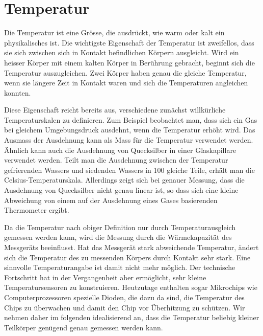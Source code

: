 %
%
%

%
%
\section{Temperatur
\label{buch:fallstudie:temperatur}}
Die Temperatur ist eine Grösse, die ausdrückt, wie warm oder kalt ein
physikalisches ist.
%
Die wichtigste Eigenschaft der Temperatur ist zweifellos, dass sie
sich zwischen sich in Kontakt befindlichen Körpern ausgleicht.
Wird ein heisser Körper mit einem kalten Körper in Berührung gebracht,
beginnt sich die Temperatur auszugleichen.
Zwei Körper haben genau die gleiche Temperatur, wenn sie längere
Zeit in Kontakt waren und sich die Temperaturen angleichen konnten.

Diese Eigenschaft reicht bereits aus, verschiedene zunächst willkürliche
Temperaturskalen zu definieren.
Zum Beispiel beobachtet man, dass sich ein Gas bei gleichem Umgebungsdruck
ausdehnt, wenn die Temperatur erhöht wird.
%
Das Ausmass der Ausdehnung kann als Mass für die Temperatur verwendet
werden.
Ähnlich kann auch die Ausdehnung von Quecksilber in einer Glaskapillare
verwendet werden.
%
%
Teilt man die Ausdehnung zwischen der Temperatur gefrierenden Wassers und
siedenden Wassers in 100 gleiche Teile, erhält man die Celsius-Temperaturskala.
Allerdings zeigt sich bei genauer Messung, dass die Ausdehnung von
%
Quecksilber nicht genau linear ist, so dass sich eine kleine Abweichung
von einem auf der Ausdehnung eines Gases basierenden Thermometer
ergibt.

Da die Temperatur nach obiger Definition nur durch Temperaturausgleich
gemessen werden kann, wird die Messung durch die Wärmekapazität des
Messgeräts beeinflusst.
Hat das Messgerät stark abweichende Temperatur, ändert sich die Temperatur
des zu messenden Körpers durch Kontakt sehr stark.
Eine sinnvolle Temperaturangabe ist damit nicht mehr möglich.
Der technische Fortschritt hat in der Vergangenheit aber ermöglicht, sehr
kleine Temperatursensoren zu konstruieren.
Heutzutage enthalten sogar Mikrochips wie Computerprozessoren spezielle
Dioden, die dazu da sind, die Temperatur des Chips zu überwachen und damit
den Chip vor Überhitzung zu schützen.
Wir nehmen daher im folgenden idealisierend an, dass die Temperatur beliebig
kleiner Teilkörper genügend genau gemessen werden kann.

%
%
